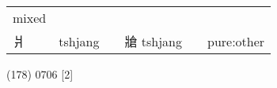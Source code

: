 \documentclass[14pt,a4paper]{scrartcl}
\begin{document}
\begin{longtable}[c]{@{}llllll@{}}
\begin{minipage}[t]{0.14\columnwidth}
mixed
\strut\end{minipage}\tabularnewline
\begin{minipage}[t]{0.14\columnwidth}\raggedright\strut
爿
\strut\end{minipage} &
\begin{minipage}[t]{0.14\columnwidth}\raggedright\strut
tshjang
\strut\end{minipage} &
\begin{minipage}[t]{0.14\columnwidth}\raggedright\strut
\strut\end{minipage} &
\begin{minipage}[t]{0.14\columnwidth}\raggedright\strut
牄 tshjang
\strut\end{minipage} &
\begin{minipage}[t]{0.14\columnwidth}\raggedright\strut
\strut\end{minipage} &
\begin{minipage}[t]{0.14\columnwidth}\raggedright\strut
pure:other
\strut\end{minipage}\tabularnewline
\bottomrule
\end{longtable}

(178) 0706 {[}2{]}
\end{document}
